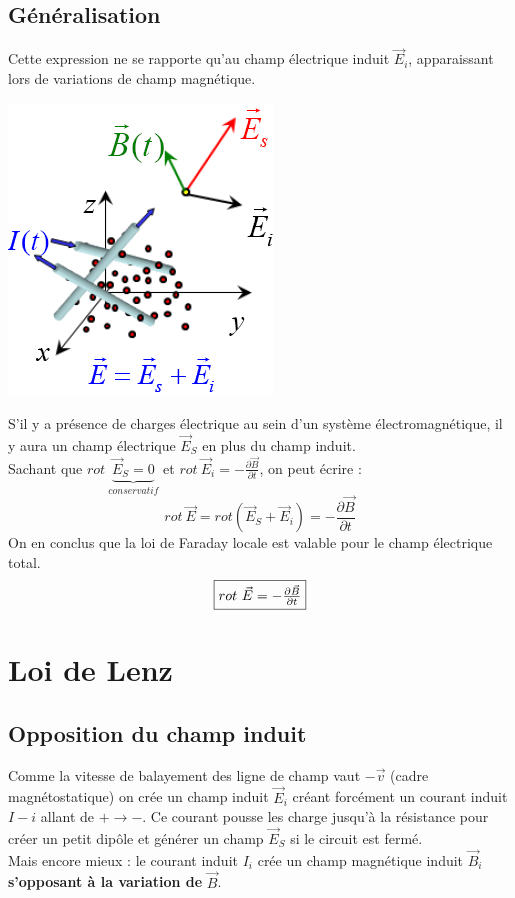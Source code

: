 \documentclass	[11pt, a4paper, openany]{book}
\begin{document}
\subsection{Généralisation}
Cette expression ne se rapporte qu'au champ électrique induit $\vec{E}_i$, apparaissant lors de variations de champ magnétique. 
\begin{center}
	\includegraphics[scale=0.45]{em/image16.png}\\
\end{center}
S'il y a présence de charges électrique au sein d'un système électromagnétique, il y aura un champ électrique $\vec{E}_S$ en plus du champ induit.\\
Sachant que $rot\ \underbrace{\vec{E}_S = 0}_{conservatif}$ et $rot\ \vec{E}_i = -\frac{\partial \vec{B}}{\partial t}$, on peut écrire :
\begin{equation}
	rot\ \vec{E} = rot(\vec{E}_S + \vec{E}_i) = -\frac{\partial \vec{B}}{\partial t}
\end{equation}
On en conclus que la loi de Faraday locale est valable pour le champ électrique total.
\begin{equation}
	\fbox{$rot\ \vec{E} = -\frac{\partial \vec{B}}{\partial t}$}
\end{equation}

\section{Loi de Lenz}
\subsection{Opposition du champ induit}
Comme la vitesse de balayement des ligne de champ vaut $-\vec{v}$ (cadre magnétostatique) on crée un champ induit $\vec{E}_i$ créant forcément un courant induit $I-i$ allant de $+ \rightarrow -$. Ce courant pousse les charge jusqu'à la résistance pour créer un petit dipôle et générer un champ $\vec{E}_S$ si le circuit est fermé.\\
Mais encore mieux : le courant induit $I_i$ crée un champ magnétique induit $\vec{B}_i$ \textbf{s'opposant à la variation de }$\vec{B}$.
\end{document}
